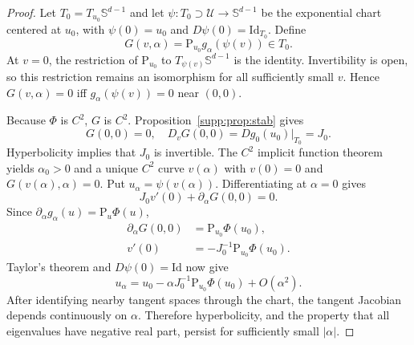 \documentclass[10pt,a4paper]{amsart}
\newcommand{\Proj}{\mathrm{P}}
\newcommand{\Sph}{\mathbb{S}}
\newcommand{\id}{\mathrm{Id}}
\begin{document}
\begin{proof}
Let $T_0=T_{u_0}\Sph^{d-1}$ and let
$\psi:T_0\supset\mathcal U\to\Sph^{d-1}$ be the exponential chart centered at
$u_0$, with $\psi(0)=u_0$ and $D\psi(0)=\id_{T_0}$. Define
\begin{equation}
G(v,\alpha)=\Proj_{u_0}g_\alpha(\psi(v))\in T_0.
\label{eq:steering-G}
\end{equation}
At $v=0$, the restriction of $\Proj_{u_0}$ to
$T_{\psi(v)}\Sph^{d-1}$ is the identity. Invertibility is open, so this
restriction remains an isomorphism for all sufficiently small $v$. Hence
$G(v,\alpha)=0$ iff $g_\alpha(\psi(v))=0$ near $(0,0)$.

Because $\Phi$ is $C^2$, $G$ is $C^2$. Proposition~\ref{supp:prop:stab} gives
\begin{equation}
G(0,0)=0,
\quad
D_vG(0,0)=Dg_0(u_0)|_{T_0}=J_0.
\end{equation}
Hyperbolicity implies that $J_0$ is invertible. The $C^2$ implicit function
theorem yields $\alpha_0>0$ and a unique $C^2$ curve $v(\alpha)$ with
$v(0)=0$ and $G(v(\alpha),\alpha)=0$. Put
$u_\alpha=\psi(v(\alpha))$. Differentiating at $\alpha=0$ gives
\begin{equation}
J_0v'(0)+\partial_\alpha G(0,0)=0.
\end{equation}
Since $\partial_\alpha g_\alpha(u)=\Proj_u\Phi(u)$,
\begin{equation}
\begin{aligned}
\partial_\alpha G(0,0)
&=\Proj_{u_0}\Phi(u_0),\\
v'(0)
&=-J_0^{-1}\Proj_{u_0}\Phi(u_0).
\end{aligned}
\end{equation}
Taylor's theorem and $D\psi(0)=\id$ now give
\begin{equation}
u_\alpha
=u_0-\alpha J_0^{-1}\Proj_{u_0}\Phi(u_0)+O(\alpha^2).
\end{equation}
After identifying nearby tangent spaces through the chart, the tangent Jacobian
depends continuously on $\alpha$. Therefore hyperbolicity, and the property that
all eigenvalues have negative real part, persist for sufficiently small
$|\alpha|$.
\end{proof}
\end{document}
